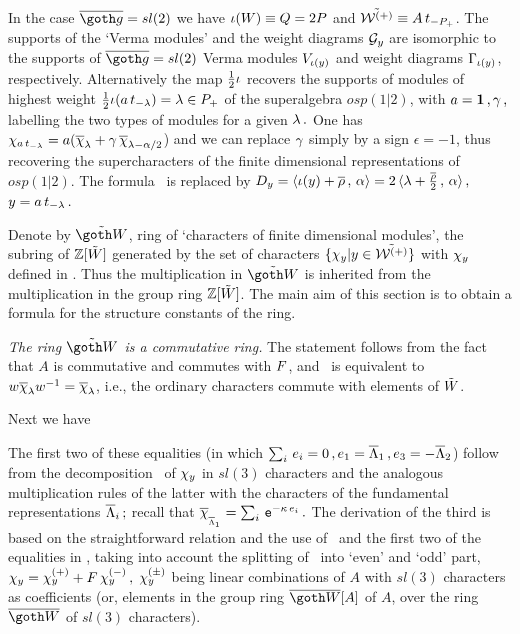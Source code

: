 \REMARK  In the case $\bgo=sl(2)$ we have 
$\iota(W)\equiv Q=2
P$ and $\tilde{{\cal W}^{(+)}}\equiv A\,t_{-P_+}$.  The supports of the `Verma
modules' and the weight diagrams ${\cal G}_y$ are isomorphic to
the supports of $\bgo=sl(2)$ Verma modules $V_{\iota(y)}$ and
weight diagrams $\Gamma_{\iota(y)}$, respectively. 
 Alternatively the map 
${1\over 2} \iota$ recovers the supports of
modules of highest weight ${1\over2} \iota(a\,t_{-\lambda})=\lambda\in
P_+$ of the superalgebra $osp(1|2)$, with
 $a={\bf 1}\,, \gamma\,,$ labelling the two types of 
modules for a given $\lambda\,.$ One has
$\chi_{a\,t_{-\lambda}} =a(\overline{\chi}_{\lambda} +\gamma\, \overline{\chi}_{\lambda-\alpha/2}$) and we
can replace $\gamma$ simply by a sign $\epsilon=- 1$, thus
recovering the supercharacters of the finite dimensional
representations of $osp(1|2)$.  
The formula \dIII\  is 
replaced by $D_y= \langle \iota(y)+\overline{\rho}\,,\, \alpha \rangle=
2\,\langle \lambda+{\overline{\rho}\over 2}\,,\, \alpha \rangle\,,$ $y=a\,t_{-\lambda}\,.$

%
%



Denote by $\tCR$, ring of `characters of finite dimensional
modules',  the subring of $\Bbb Z[\tilde W]$ generated by 
the set of characters $\{\chi_y | y\in\tilde{{\cal W}^{(+)}}\}$ with $\chi_y$
defined in \res.  Thus the multiplication in $\tCR$ is inherited
from the multiplication in the group ring $\Bbb Z[\tilde W]$.  The main
aim of this section is to obtain a formula for the structure
constants of the ring.

 {\it The ring $\tCR$ 
is a commutative ring.}
\PROOF 
The statement follows from the fact that $A$ is commutative and
commutes with $F$, and \ginv\ is equivalent to
$w\overline{\chi}_{\lambda}w^{-1}=\overline{\chi}_{\lambda}$, i.e., the ordinary characters
commute with elements of $\tilde W$.
\endPROOF

Next we have

%
\eqn{}
%
\PROOF
The first two of these equalities (in which $\sum_i\, e_i=0\,,
e_1=\overline{\Lambda}_1\,, e_3=-\overline{\Lambda}_2$) follow from the decomposition \fch\ of
$\chi_y$ in $sl(3)$ characters and the analogous multiplication
rules of the latter with the characters of the fundamental
representations $\overline{\Lambda}_i\,;$ recall that
$\overline{\chi}_{_{\overline{\Lambda}_1}}=\sum_{i}\,{\tt e}^{-\kappa \, e_i}\,.$ The
derivation of the third is based on the straightforward relation
%
\eqn{}
%
and the use of \scur\ and the first two of the equalities in
\fmult, taking into account the splitting of \fch\ into `even'
and `odd' part, $\chi_y=\chi_y^{(+)} +F\, \chi_y^{(-)}\,,$
$\chi_y^{(\pm)}$ being linear combinations of $A$ with  $sl(3)$
characters as coefficients (or, elements in the group ring
$\overline{\CR}[A]$ of $A$, over the ring $\overline{\CR}$ of
$sl(3)$ characters). 
\endPROOF

